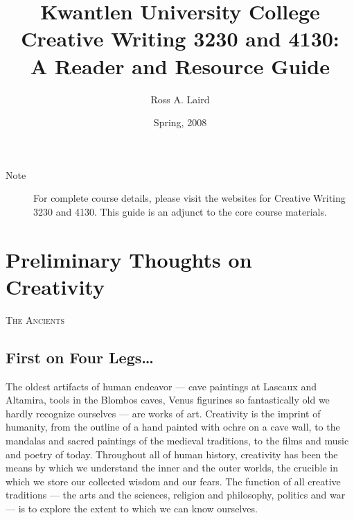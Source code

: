 \documentclass[letterpaper,oneside]{memoir}
\title{Kwantlen University College \\Creative Writing 3230 and 4130:\\A Reader and Resource Guide}
\author{Ross A. Laird}
\date{Spring, 2008}
\begin{document}
\begin{titlingpage}
\setlength{\droptitle}{30pt}
\maketitle
\end{titlingpage}
\newpage
\begin{titlingpage}
\setlength{\droptitle}{30pt}
\maketitle
\end{titlingpage}
\frontmatter
\vspace*{5cm}
\begin{framed}
  \begin{description}
  \item[Note]For complete course details, please visit the websites
    for Creative Writing 3230 and 4130. 
    This guide is an adjunct to the core course materials.
  \end{description}
\end{framed}
\newpage
\tableofcontents*
\mainmatter
\chapter{Preliminary Thoughts on Creativity}
\begin{epigraphs}
{\textsc{The Ancients}}\\
\end{epigraphs}
\section{First on Four Legs\ldots}
The oldest artifacts of human endeavor --- cave paintings at Lascaux and Altamira, tools in the Blombos caves, Venus figurines so fantastically old we hardly recognize ourselves ---  are works of art. Creativity is the imprint of humanity, from the outline of a hand painted with ochre on a cave wall, to the mandalas and sacred paintings of the medieval traditions, to the films and music and poetry of today. Throughout all of human history, creativity has been the means by which we understand the inner and the outer worlds, the crucible in which we store our collected wisdom and our fears. The function of all creative traditions --- the arts and the sciences, religion and philosophy, politics and war --- is to explore the extent to which we can know ourselves.
\end{document}

